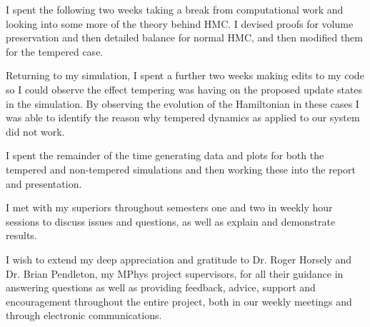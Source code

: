 \documentclass[12pt]{article}
\begin{document}
    I spent the following two weeks taking a break from computational work and looking into some more of the theory behind HMC. I devised proofs for volume preservation and then detailed balance for normal HMC, and then modified them for the tempered case.

    Returning to my simulation, I spent a further two weeks making edits to my code so I could observe the effect tempering was having on the proposed update states in the simulation. By observing the evolution of the Hamiltonian in these cases I was able to identify the reason why tempered dynamics as applied to our system did not work.

    I spent the remainder of the time generating data and plots for both the tempered and non-tempered simulations and then working these into the report and presentation. 

    I met with my superiors throughout semesters one and two in weekly hour sessions to discuss issues and questions, as well as explain and demonstrate results.



\acknowledgments
I wish to extend my deep appreciation and gratitude to Dr. Roger Horsely and Dr. Brian Pendleton, my MPhys project supervisors, for all their guidance in answering questions as well as providing feedback, advice, support and encouragement throughout the entire project, both in our weekly meetings and through electronic communications.



\maintext
\end{document}
